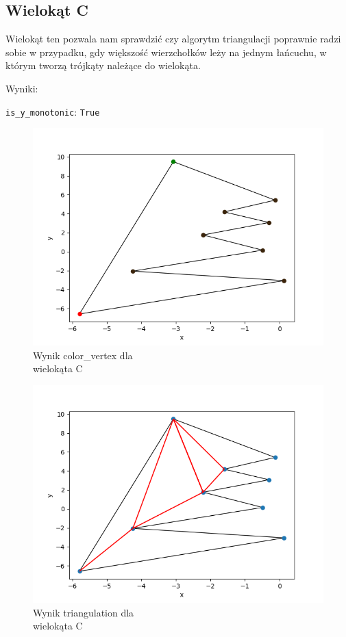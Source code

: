 \documentclass[11pt,a4paper]{article}
\begin{document}
\subsection{Wielokąt C}
Wielokąt ten pozwala nam sprawdzić czy algorytm triangulacji
poprawnie radzi sobie w przypadku, gdy większość wierzchołków leży
na jednym łańcuchu, w którym tworzą trójkąty należące do wielokąta.

Wyniki:

\verb|is_y_monotonic|: \verb|True|

\begin{minipage}{0.46\textwidth}
    \begin{figure}[H]
        \centering
        \includegraphics[scale=0.5]{res/pol_c_colors.png}
        \caption{Wynik \ttfamily color\_vertex \normalfont dla \\wielokąta C}
    \end{figure}
\end{minipage}
\begin{minipage}{0.46\textwidth}
    \begin{figure}[H]
        \centering
        \includegraphics[scale=0.5]{res/pol_c_tri.png}
        \caption{Wynik \ttfamily triangulation \normalfont dla \\wielokąta C}
    \end{figure}
\end{minipage}
\end{document}
